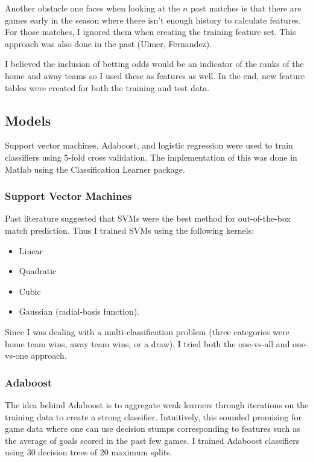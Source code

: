 \documentclass[paper=a4, fontsize=11pt]{scrartcl}
\numberwithin{equation}{section}		%
\numberwithin{figure}{section}			%
\numberwithin{table}{section}				%
\begin{document}
Another obstacle one faces when looking at the $n$ past matches is that there are games early in the season where there isn't enough history to calculate features. For those matches, I ignored them when creating the training feature set. This approach was also done in the past (Ulmer, Fernandez). 

I believed the inclusion of betting odds would be an indicator of the ranks of the home and away teams so I used these as features as well. In the end, new feature tables were created for both the training and test data.

\subsection{Models}

Support vector machines, Adaboost, and logistic regression were used to train classifiers using $5$-fold cross validation. The implementation of this was done in Matlab using the Classification Learner package.

\subsubsection{Support Vector Machines}

Past literature suggested that SVMs were the best method for out-of-the-box match prediction. Thus I trained SVMs using the following kernels:
\begin{itemize}
\item Linear
\item Quadratic
\item Cubic
\item Gaussian (radial-basis function).
\end{itemize}

Since I was dealing with a multi-classification problem (three categories were home team wins, away team wins, or a draw), I tried both the one-vs-all and one-vs-one approach.

\subsubsection{Adaboost}

The idea behind Adaboost is to aggregate weak learners through iterations on the training data to create a strong classifier. Intuitively, this sounded promising for game data where one can use decision stumps corresponding to features such as the average of goals scored in the past few games. I trained Adaboost classifiers using $30$ decision trees of $20$ maximum splits.
\end{document}
